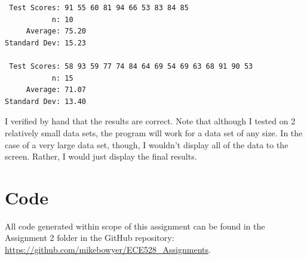 \documentclass[12pt, letterpaper, final, onecolumn, titlepage] {article}
\begin{document}
\singlespacing
\begin{lstlisting}
 Test Scores: 91 55 60 81 94 66 53 83 84 85 
           n: 10
     Average: 75.20
Standard Dev: 15.23

 Test Scores: 58 93 59 77 74 84 64 69 54 69 63 68 91 90 53
           n: 15
     Average: 71.07
Standard Dev: 13.40
\end{lstlisting}
\doublespacing

I verified by hand that the results are correct. Note that although I tested on 2 relatively small data sets, the program will work for a data set of any size. In the case of a very large data set, though, I wouldn’t display all of the data to the screen. Rather, I would just display the final results.

\pagebreak

\section{Code}

All code generated within scope of this assignment can be found in the Assignment 2 folder in the GitHub repository:
\url{https://github.com/mikebowyer/ECE528_Assignments}.
\end{document}
